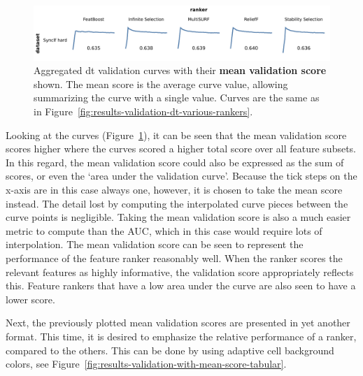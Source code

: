 \documentclass[../main.tex]{subfiles}
\begin{document}
\begin{figure}[ht]
    \centering
    \includegraphics[width=\linewidth]{report/images/results-validation-with-mean-score.pdf}
    \caption{Aggregated \gls{dt} validation curves with their \textbf{mean validation score} shown. The mean score is the average curve value, allowing summarizing the curve with a single value. Curves are the same as in Figure~\ref{fig:results-validation-dt-various-rankers}.}
    \label{fig:results-validation-with-mean-score}
\end{figure}

Looking at the curves (Figure~\ref{fig:results-validation-with-mean-score}), it can be seen that the mean validation score scores higher where the curves scored a higher total score over all feature subsets. In this regard, the mean validation score could also be expressed as the sum of scores, or even the `area under the validation curve'. Because the tick steps on the x-axis are in this case always one, however, it is chosen to take the mean score instead. The detail lost by computing the interpolated curve pieces between the curve points is negligible. Taking the mean validation score is also a much easier metric to compute than the AUC, which in this case would require lots of interpolation. The mean validation score can be seen to represent the performance of the feature ranker reasonably well. When the ranker scores the relevant features as highly informative, the validation score appropriately reflects this. Feature rankers that have a low area under the curve are also seen to have a lower score.


Next, the previously plotted mean validation scores are presented in yet another format. This time, it is desired to emphasize the relative performance of a ranker, compared to the others. This can be done by using adaptive cell background colors, see Figure~\ref{fig:results-validation-with-mean-score-tabular}.
\end{document}
